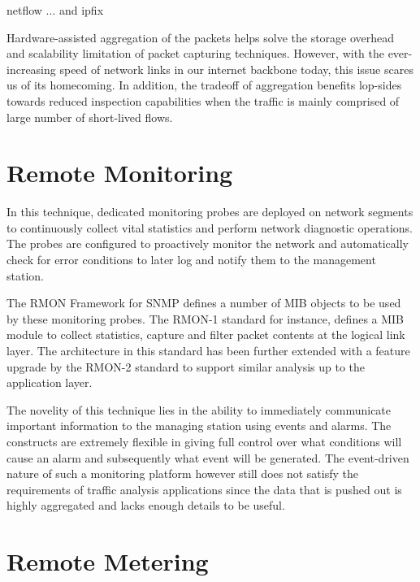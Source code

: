 netflow {...} and ipfix \cite{...} 

Hardware-assisted aggregation of the packets helps solve the storage overhead and scalability limitation of packet capturing techniques. However, with the ever-increasing  speed of network links in our internet backbone today, this issue scares us of its homecoming. In addition, the tradeoff of aggregation benefits lop-sides towards reduced inspection capabilities when the traffic is mainly comprised of large number of short-lived flows. 


\section{Remote Monitoring}\label{sec:remote-monitoring}
In this technique, dedicated monitoring probes are deployed on network segments to continuously collect vital statistics and perform network diagnostic operations. The probes are configured to proactively monitor the network and automatically check for error conditions to later log and notify them to the management station. 

The \ac{RMON} Framework \cite{rfc3577} for \ac{SNMP} \cite{rfc1157} defines a number of \ac{MIB} objects to be used by these monitoring probes. The \ac{RMON}-1 standard \cite{rfc2819} for instance, defines a \ac{MIB}  module to collect statistics, capture and filter packet contents at the logical link layer. The architecture in this standard has been further extended with a feature upgrade by the \ac{RMON}-2 standard \cite{rfc4502} to support similar analysis up to the application layer.

The novelity of this technique lies in the ability to immediately communicate important information to the managing station using events and alarms. The constructs are extremely flexible in giving full control over what conditions will cause an alarm  and subsequently what event will be generated. The event-driven nature of such a monitoring platform however still does not satisfy the requirements of traffic analysis applications since the data that is pushed out is highly aggregated and lacks enough details to be useful. 


\section{Remote Metering}\label{sec:remote-metering}